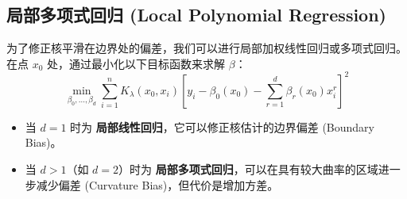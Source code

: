 \documentclass[UTF8]{ctexart}
\begin{document}
\subsection{局部多项式回归 (Local Polynomial Regression)}
为了修正核平滑在边界处的偏差，我们可以进行局部加权线性回归或多项式回归。
在点 $x_0$ 处，通过最小化以下目标函数来求解 $\beta$：
$$ \min_{\beta_0, \ldots, \beta_d} \sum_{i=1}^n K_\lambda(x_0, x_i) \left[ y_i - \beta_0(x_0) - \sum_{r=1}^d \beta_r(x_0) x_i^r \right]^2 $$
\begin{itemize}
    \item 当 $d=1$ 时为 \textbf{局部线性回归}，它可以修正核估计的边界偏差 (Boundary Bias)。
    \item 当 $d>1$（如 $d=2$）时为 \textbf{局部多项式回归}，可以在具有较大曲率的区域进一步减少偏差 (Curvature Bias)，但代价是增加方差。
\end{itemize}
\end{document}
